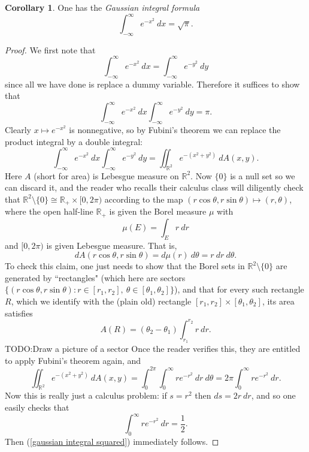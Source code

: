 \documentclass[12pt]{book}
\newcommand{\RR}{\mathbb{R}}
\newcommand{\dfn}[1]{\emph{#1}\index{#1}}
\theoremstyle{definition}
\newtheorem{corollary}[theorem]{Corollary}
\begin{document}
\begin{corollary}
One has the \dfn{Gaussian integral formula}
$$\int_{-\infty}^\infty e^{-x^2} ~dx = \sqrt \pi.$$
\end{corollary}
\begin{proof}
We first note that
$$\int_{-\infty}^\infty e^{-x^2}~dx = \int_{-\infty}^\infty e^{-y^2}~dy$$
since all we have done is replace a dummy variable. Therefore it suffices to show that
\begin{equation}
\label{gaussian integral squared}
\int_{-\infty}^\infty e^{-x^2}~dx \int_{-\infty}^\infty e^{-y^2}~dy = \pi.
\end{equation}
Clearly $x \mapsto e^{-x^2}$ is nonnegative, so by Fubini's theorem we can replace the product integral by a double integral:
$$\int_{-\infty}^\infty e^{-x^2}~dx \int_{-\infty}^\infty e^{-y^2}~dy = \iint_{\RR^2} e^{-(x^2 + y^2)}~dA(x, y).$$
Here $A$ (short for area) is Lebesgue measure on $\RR^2$.
Now $\{0\}$ is a null set so we can discard it, and the reader who recalls their calculus class will diligently check that $\RR^2 \setminus \{0\} \cong \RR_+ \times [0, 2\pi)$ according to the map $(r \cos \theta, r \sin \theta) \mapsto (r, \theta)$, where the open half-line $\RR_+$ is given the Borel measure $\mu$ with
$$\mu(E) = \int_E r~dr$$
and $[0, 2\pi)$ is given Lebesgue measure. That is,
$$dA(r \cos \theta, r \sin \theta) = d\mu(r) ~d\theta = r~dr~d\theta.$$
To check this claim, one just needs to show that the Borel sets in $\RR^2 \setminus \{0\}$ are generated by ``rectangles" (which here are sectors $\{(r \cos \theta, r \sin \theta): r \in [r_1, r_2], ~\theta \in [\theta_1, \theta_2]\}$), and that for every such rectangle $R$, which we identify with the (plain old) rectangle $[r_1, r_2] \times [\theta_1, \theta_2]$, its area satisfies
$$A(R) = (\theta_2 - \theta_1)\int_{r_1}^{r_2} r~dr.$$
TODO:Draw a picture of a sector
Once the reader verifies this, they are entitled to apply Fubini's theorem again, and
$$\iint_{\RR^2} e^{-(x^2 + y^2)}~dA(x, y) = \int_0^{2\pi} \int_0^\infty re^{-r^2}~dr~d\theta = 2\pi \int_0^\infty re^{-r^2}~dr.$$
Now this is really just a calculus problem: if $s = r^2$ then $ds = 2r~dr$, and so one easily checks that
$$\int_0^\infty re^{-r^2}~dr = \frac{1}{2}.$$
Then (\ref{gaussian integral squared}) immediately follows.
\end{proof}
\end{document}
